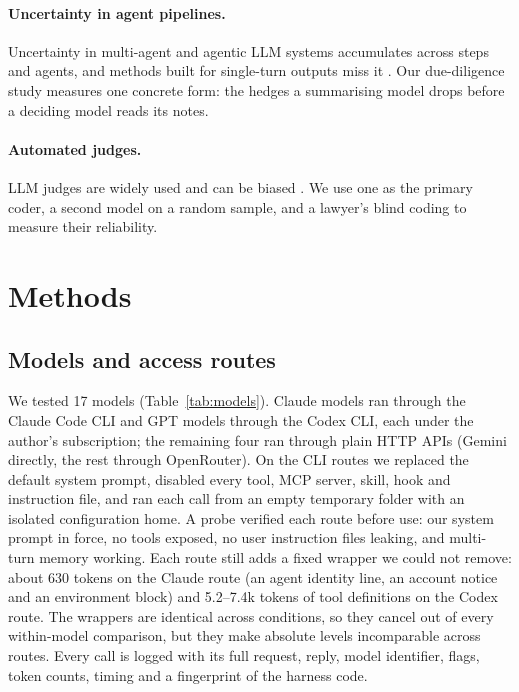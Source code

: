 \documentclass[11pt]{article}
\begin{document}
\paragraph{Uncertainty in agent pipelines.} Uncertainty in multi-agent and agentic LLM systems
accumulates across steps and agents, and methods built for single-turn outputs miss it
\citep{chen2026every,lin2026uncertainty}. Our due-diligence study measures one concrete form: the
hedges a summarising model drops before a deciding model reads its notes.

\paragraph{Automated judges.} LLM judges are widely used and can be biased
\citep{zheng2023judging,wang2023fair}. We use one as the primary coder, a second model on a random
sample, and a lawyer's blind coding to measure their reliability.

\section{Methods}

\subsection{Models and access routes}

We tested 17 models (Table~\ref{tab:models}). Claude models ran through the Claude Code CLI and GPT
models through the Codex CLI, each under the author's subscription; the remaining four ran through
plain HTTP APIs (Gemini directly, the rest through OpenRouter). On the CLI routes we replaced the
default system prompt, disabled every tool, MCP server, skill, hook and instruction file, and ran
each call from an empty temporary folder with an isolated configuration home. A probe verified each
route before use: our system prompt in force, no tools exposed, no user instruction files leaking,
and multi-turn memory working. Each route still adds a fixed wrapper we could not remove: about 630
tokens on the Claude route (an agent identity line, an account notice and an environment block) and
5.2--7.4k tokens of tool definitions on the Codex route. The wrappers are identical across
conditions, so they cancel out of every within-model comparison, but they make absolute levels
incomparable across routes. Every call is logged with its full request, reply, model identifier,
flags, token counts, timing and a fingerprint of the harness code.
\end{document}
